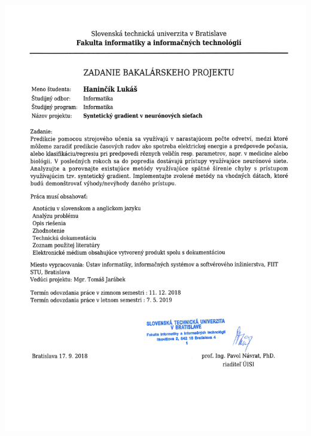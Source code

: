 \documentclass[12pt, twoside]{book}
\def\mfrok{2018}
\def\mfautor{Lukáš Haninčík}
\def\mfmiesto{Bratislava, \mfrok}
\begin{document}



\eject %






\newpage 
\afterpage{\null\thispagestyle{empty}\newpage}

\thispagestyle{empty}
\hspace{-3.5cm}\includegraphics[width=1.25\textwidth]{images/zadanie}


\frontmatter

\end{document}

